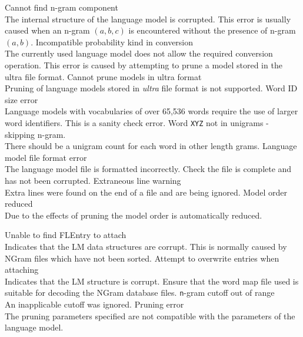 \begin{itemize}

\begin{itemize}
   Cannot find n-gram component\\
        The internal structure of the language model is corrupted. This error
        is usually caused when an n-gram $(a,b,c)$ is encountered without
        the presence of n-gram $(a,b)$.
   Incompatible probability kind in conversion\\      
        The currently used language model does not allow the required
        conversion operation. This error is caused by attempting to prune a
        model stored in the ultra file format.
   Cannot prune models in ultra format\\
        Pruning of language models stored in {\em ultra} file format is not
        supported.
   Word ID size error\\
        Language models with vocabularies of over 65,536 words require the
        use of larger word identifiers. This is a sanity check error.
   Word \texttt{XYZ} not in unigrams - skipping n-gram.\\
        There should be a unigram count for each word in other length grams.
   Language model file format error\\
        The language model file is formatted incorrectly. Check the file is
        complete and has not been corrupted.
   Extraneous line warning\\
        Extra lines were found on the end of a file and are being ignored.
   Model order reduced\\
        Due to the effects of pruning the model order is automatically reduced.
\end{itemize}



\begin{itemize}
   Unable to find FLEntry to attach\\
        Indicates that the LM data structures are corrupt. This is normally caused
        by NGram files which have not been sorted.
   Attempt to overwrite entries when attaching\\
        Indicates that the LM structure is corrupt. Ensure that the word map file
        used is suitable for decoding the NGram database files.
   \texttt{n}-gram cutoff out of range\\
        An inapplicable cutoff was ignored.
   Pruning error\\
        The pruning parameters specified are not compatible with the parameters 
        of the language model.
\end{itemize}



\end{itemize}
